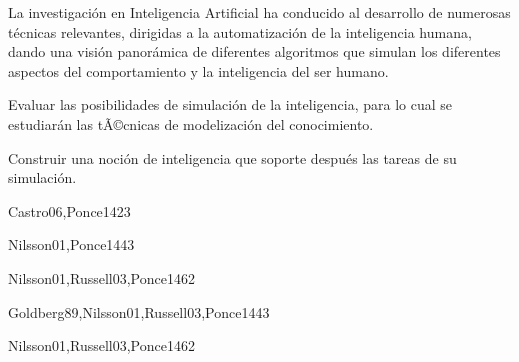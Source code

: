 \begin{syllabus}


\begin{justification}
La investigación en Inteligencia Artificial ha conducido al desarrollo de
numerosas técnicas relevantes, dirigidas a la automatización de la
inteligencia humana, dando una visión panorámica de diferentes
algoritmos que simulan los diferentes aspectos del comportamiento
y la inteligencia del ser humano.
\end{justification}

\begin{goals}
\item Evaluar las posibilidades de simulación de la inteligencia, para lo cual se estudiarán las tÃ©cnicas de modelización del conocimiento.
\item Construir una noción de inteligencia que soporte después las tareas de su simulación.
\end{goals}

\begin{outcomes}
\end{outcomes}

\begin{unit}{\ISFundamentalIssuesDef}{Castro06,Ponce14}{2}{3}
    \ISFundamentalIssuesAllTopics
    \ISFundamentalIssuesAllObjectives
\end{unit}

\begin{unit}{\ISBasicSearchStrategiesDef}{Nilsson01,Ponce14}{4}{3}
    \ISBasicSearchStrategiesAllTopics
    \ISBasicSearchStrategiesAllObjectives
\end{unit}

\begin{unit}{\ISKnowledgementBasedReasoningDef}{Nilsson01,Russell03,Ponce14}{6}{2}
    \ISKnowledgementBasedReasoningAllTopics
    \ISKnowledgementBasedReasoningAllObjectives
\end{unit}

\begin{unit}{\ISAdvancedSearchDef}{Goldberg89,Nilsson01,Russell03,Ponce14}{4}{3}
     \ISAdvancedSearchAllTopics
     \ISAdvancedSearchAllObjectives
\end{unit}

\begin{unit}{\ISAdvancedReasoningDef}{Nilsson01,Russell03,Ponce14}{6}{2}
    \ISAdvancedReasoningAllTopics
    \ISAdvancedReasoningAllObjectives
\end{unit}


\end{syllabus}
